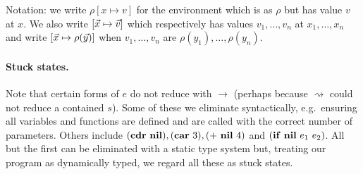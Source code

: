Notation:  we write $\rho[x \mapsto v]$ for the environment which is
as $\rho$ but has value $v$ at $x$.
We also write $[\myvec{x} \mapsto \myvec{v}]$ which respectively
has values $v_1, \ldots, v_n$ at $x_1, \ldots, x_n$ and write
$[\myvec{x} \mapsto \rho(\myvec{y})]$ when 
$v_1, \ldots, v_n$ are $\rho(y_1), \ldots, \rho(y_n)$.

\paragraph{Stuck states.} Note that certain forms of $e$ do not reduce
with $\rightarrow$ (perhaps because $\rightsquigarrow$ could not reduce
a contained $s$).  Some of these we eliminate syntactically, e.g.\
ensuring all variables and functions are defined and are called with
the correct number of parameters.
Others include $(\mbox{$\mathbf{cdr}$}\ \mbox{$\mathbf{ nil}$}), (\mbox{$\mathbf{car}$}\ 3), (+\ \mbox{$\mathbf{ nil}$}\ 4)$ and $(\SIF\ \NIL\ e_1\ e_2)$.
All but the first can be eliminated with a static type system but,
treating our program as dynamically typed, we regard all these
as stuck states.




